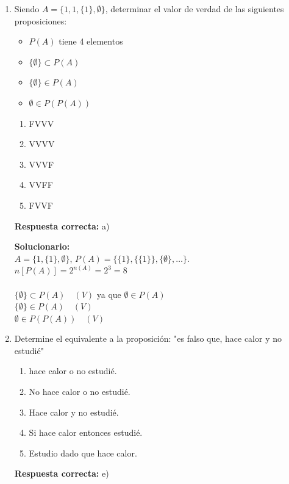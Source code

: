 \begin{enumerate}
	
	
	
	\item Siendo $A = \{ 1, 1, \{1\}, \emptyset \}$, determinar el valor de verdad de las siguientes proposiciones:
	\begin{itemize}
		\item[I.] $P(A)$ tiene 4 elementos
		\item[II.] $\{\emptyset\} \subset P(A)$
		\item[III.] $\{\emptyset\} \in P(A)$
		\item[IV.] $\emptyset \in P(P(A))$
	\end{itemize}
	\begin{enumerate}[label=\alph*)]
		\item FVVV
		\item VVVV
		\item VVVF
		\item VVFF
		\item FVVF
	\end{enumerate}
	\textbf{Respuesta correcta:} a) 
	
	\vspace{2mm}
	\textbf{Solucionario:}\\
	$A = \{1, \{1\}, \emptyset\}$, $P(A) = \{\{1\}, \{\{1\}\}, \{\emptyset\}, \dots \}$.\\
	$n[P(A)] = 2^{n(A)} = 2^3 = 8$\\
	\\
	$\{\emptyset\} \subset P(A) \quad (V)$ ya que $\emptyset \in P(A)$\\
	$\{\emptyset\} \in P(A) \quad (V)$\\
	$\emptyset \in P(P(A)) \quad (V)$
	
	\vspace{6mm}
	
	\item Determine el equivalente a la proposición: "es falso que, hace calor y no estudié"
	\begin{enumerate}[label=\alph*)]
		\item hace calor o no estudié.
		\item No hace calor o no estudié.
		\item Hace calor y no estudié.
		\item Si hace calor entonces estudié.
		\item Estudio dado que hace calor.
	\end{enumerate}
	\textbf{Respuesta correcta:} e)
	

\end{enumerate}
